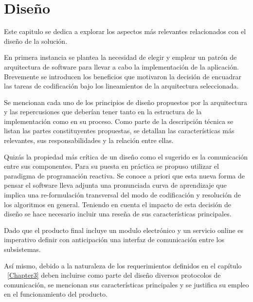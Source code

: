 
\chapter{Diseño} %

\label{Chapter5} %

Este capitulo se dedica a explorar los aspectos más relevantes relacionados con el diseño de la solución.

En primera instancia se plantea la necesidad de elegir y emplear un patrón de arquitectura de software 
para llevar a cabo la implementación de la aplicación. Brevemente se introducen los beneficios que motivaron la decisión de 
encuadrar las tareas de codificación bajo los lineamientos de la arquitectura seleccionada.

Se mencionan cada uno de los principios de diseño propuestos por la arquitectura y las repercusiones que deberían tener tanto en la estructura de la implementación como en su proceso.
Como parte de la descripción técnica se listan las partes constituyentes propuestas, se detallan las características más relevantes, sus responsabilidades y la relación entre ellas.

Quizás la propiedad más crítica de un diseño como el sugerido es la comunicación entre sus componentes.
Para su puesta en práctica se propuso utilizar el paradigma de programación reactiva. Se conoce a priori que esta nueva forma de pensar el software lleva adjunta una pronunciada curva de aprendizaje que implica una re-formulación
transversal del modo de codificación y resolución de los algoritmos en general. 
Teniendo en cuenta el impacto de esta decisión de diseño se hace necesario incluir una reseña de sus características principales.

Dado que el producto final incluye un modulo electrónico y un servicio online es imperativo definir con anticipación una interfaz de comunicación entre los subsistemas.

Así mismo, debido a la naturaleza de los requerimientos definidos en el capítulo ~\ref{Chapter3} deben incluirse como parte del diseño diversos protocolos de comunicación, se mencionan sus características principales y se justifica su empleo en el funcionamiento del producto.

